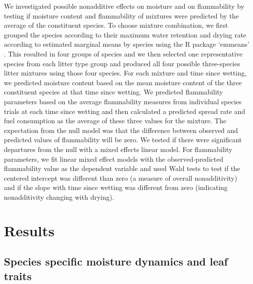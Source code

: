 \documentclass[letterpaper,12pt]{article}
\begin{document}
We investigated possible nonadditive effects on moisture and on flammability by
testing if moisture content and flammability of mixtures were predicted by the
average of the constituent species. To choose mixture combination, we first
grouped the species according to their maximum water retention and drying rate
according to estimated marginal means by species using the R package `emmeans'
\citep{Lenth-2019}. This resulted in four groups of species and we then
selected one representative species from each litter type group and produced
all four possible three-species litter mixtures using those four species. For
each mixture and time since wetting, we predicted moisture content based on the
mean moisture content of the three constituent species at that time since
wetting. We predicted flammability parameters based on the average flammability
measures from individual species trials at each time since wetting and then
calculated a predicted spread rate and fuel consumption as the average of these
three values for the mixture. The expectation from the null model was that the
difference between observed and predicted values of flammability will be zero.
We tested if there were significant departures from the null with a mixed
effects linear model. For flammability parameters, we fit linear mixed effect
models with the observed-predicted flammability value as the dependent variable
and used Wald tests to test if the centered intercept was different than zero
(a measure of overall nonadditivity) and if the slope with time since wetting
was different from zero (indicating nonadditivity changing with drying).

\section*{Results}

\subsection*{Species specific moisture dynamics and leaf traits}
\end{document}
